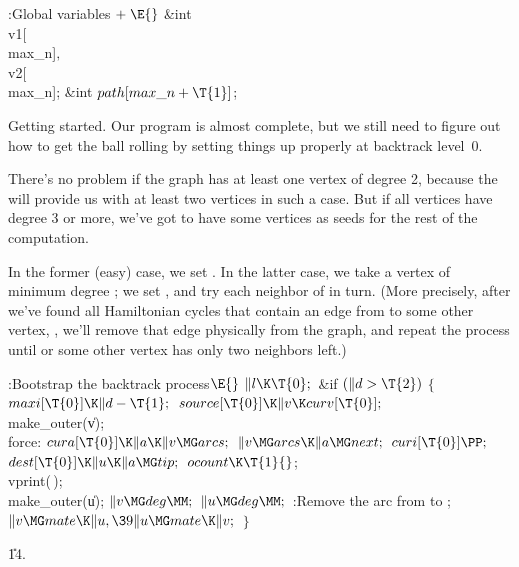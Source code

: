 \B{}:Global variables\X${}\mathrel+\E{}$\6
\&{int} \\{v1}[\\{max\_n}]${},{}$ \\{v2}[\\{max\_n}];\6
\&{int} ${}\\{path}[\\{max\_n}+\T{1}]{}$;\par
\fi

Getting started. Our program is almost complete, but
we still need to
figure out how to get the ball rolling by setting things up properly
at backtrack level~0.

There's no problem if the graph has at least one vertex of degree 2,
because the  will provide us with at least two 
vertices
in such a case. But if all vertices have degree 3 or more, we've got to
have some  vertices as seeds for the rest of the computation.

In the former (easy) case, we set . In the latter
case,
we take a vertex  of minimum degree ; we set ,
and try each neighbor of  in turn. (More precisely, after we've found
all Hamiltonian cycles that contain an edge from  to some other vertex,
, we'll remove that edge physically from the graph, and repeat
the process until  or some other vertex has only two neighbors left.)

\Y\B\4:Bootstrap the backtrack process\X${}\E{}$\6
$\|l\K\T{0};{}$\6
\&{if} ${}(\|d>\T{2}){}$\5
${}\{{}$\1\6
${}\\{maxi}[\T{0}]\K\|d-\T{1};{}$\6
${}\\{source}[\T{0}]\K\|v\K\\{curv}[\T{0}];{}$\6
\\{make\_outer}(\|v);\6
\4\\{force}:\5
${}\\{cura}[\T{0}]\K\|a\K\|v\MG\\{arcs};{}$\6
${}\|v\MG\\{arcs}\K\|a\MG\\{next};{}$\6
${}\\{curi}[\T{0}]\PP;{}$\6
${}\\{dest}[\T{0}]\K\|u\K\|a\MG\\{tip};{}$\6
${}\\{ocount}\K\T{1}{}$;\5
\\{vprint}(\,);\6
\\{make\_outer}(\|u);\6
${}\|v\MG\\{deg}\MM;{}$\6
${}\|u\MG\\{deg}\MM;{}$\6
:Remove the arc from  to \X;\6
${}\|v\MG\\{mate}\K\|u,\39\|u\MG\\{mate}\K\|v;{}$\6
\4${}\}{}$\2\par
\U14.\fi

